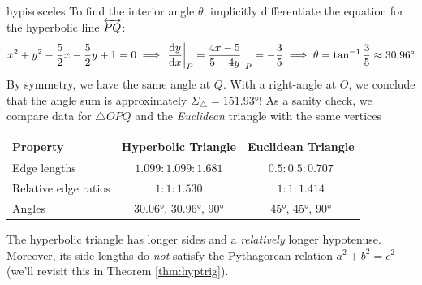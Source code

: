 \begin{example}{}{hypisosceles}
To find the interior angle $\theta$, implicitly differentiate the equation for the hyperbolic line $\lin{PQ}$:
\[x^2+y^2-\frac 52x-\frac 52y+1=0 \implies \diffat[y]{x}{P}=\frac{4x-5}{5-4y}\bigg|_P=-\frac 35 \implies \theta=\tan^{-1}\frac 35\approx \ang{30.96}\]
By symmetry, we have the same angle at $Q$. With a right-angle at $O$, we conclude that the angle sum is approximately $\Sigma_\triangle=\ang{151.93}$!\smallbreak
As a sanity check, we compare data for $\triangle OPQ$ and the \emph{Euclidean} triangle with the same vertices
\begin{center}
\begin{tabular}{l||c|c}
Property&Hyperbolic Triangle&Euclidean Triangle\\\hline\hline
Edge lengths&$1.099:1.099:1.681$&$0.5:0.5:0.707$\\
Relative edge ratios&$1:1:1.530$&$1:1:1.414$\\
Angles&\ang{30.06}, \ang{30.96}, \ang{90}&\ang{45}, \ang{45}, \ang{90}%
\end{tabular}
\end{center}
The hyperbolic triangle has longer sides and a \emph{relatively} longer hypotenuse. Moreover, its side lengths do \emph{not} satisfy the Pythagorean relation $a^2+b^2=c^2$ (we'll revisit this in Theorem \ref{thm:hyptrig}).
\end{example}

